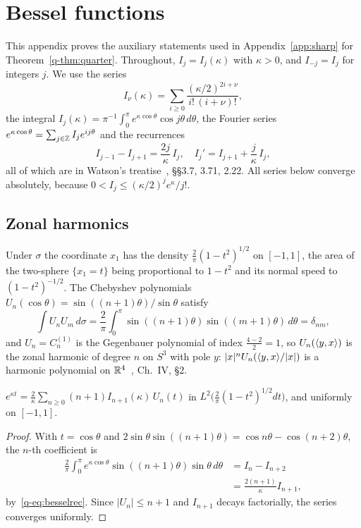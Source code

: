 \section{Bessel functions}\label{app:bessel}

This appendix proves the auxiliary statements used in Appendix~\ref{app:sharp}
for Theorem~\ref{q-thm:quarter}. Throughout, $I_j=I_j(\kappa)$ with $\kappa>0$,
and $I_{-j}=I_j$ for integers $j$. We use the series
\[
I_\nu(\kappa)=\sum_{i\ge0}\frac{(\kappa/2)^{2i+\nu}}{i!\,(i+\nu)!},
\]
the integral $I_j(\kappa)=\pi^{-1}\int_0^\pi e^{\kappa\cos\theta}\cos
j\theta\,d\theta$, the Fourier series $e^{\kappa\cos\theta}=\sum_{j\in\mathbb{Z}}
I_je^{ij\theta}$ and the recurrences
\begin{equation}\label{q-eq:besselrec}
I_{j-1}-I_{j+1}=\frac{2j}\kappa\,I_j,\quad I_j'=I_{j+1}+\frac j\kappa\,I_j ,
\end{equation}
all of which are in Watson's treatise~\cite{Wat44}, \S\S3.7, 3.71,
2.22. All series below converge absolutely, because $0<I_j\le(\kappa/2)^j
e^\kappa/j!$.

\subsection{Zonal harmonics}

Under $\sigma$ the coordinate $x_1$ has the density $\frac2\pi(1-t^2)^{1/2}$
on $[-1,1]$, the area of the two-sphere $\{x_1=t\}$ being proportional to
$1-t^2$ and its normal speed to $(1-t^2)^{-1/2}$. The Chebyshev polynomials
$U_n(\cos\theta)=\sin((n+1)\theta)/\sin\theta$ satisfy
\[
\int U_nU_m\,d\sigma=\frac2\pi\int_0^\pi\sin((n+1)\theta)\sin((m+1)\theta)
\,d\theta=\delta_{nm},
\]
and $U_n=C_n^{(1)}$ is the Gegenbauer polynomial of index $\frac{4-2}2=1$, so
$U_n(\langle y,x\rangle)$ is the zonal harmonic of degree $n$ on $S^3$ with pole $y$:
$|x|^nU_n(\langle y,x\rangle/|x|)$ is a harmonic polynomial on $\mathbb{R}^4$~\cite{SW71},
Ch.~IV, \S2.

\begin{lemma}\label{q-lem:chebexp}
$e^{\kappa t}=\frac2\kappa\sum_{n\ge0}(n+1)I_{n+1}(\kappa)\,U_n(t)$ in
$L^2\bigl(\frac2\pi(1-t^2)^{1/2}dt\bigr)$, and uniformly on $[-1,1]$.
\end{lemma}

\begin{proof}
With $t=\cos\theta$ and $2\sin\theta\sin((n+1)\theta)=\cos n\theta-\cos(
n+2)\theta$, the $n$-th coefficient is
\[
\begin{aligned}
\frac2\pi\int_0^\pi e^{\kappa\cos\theta}\sin((n+1)\theta)\sin\theta\,d\theta
&=I_n-I_{n+2}\\
&=\frac{2(n+1)}\kappa I_{n+1},
\end{aligned}
\]
by~\eqref{q-eq:besselrec}. Since $|U_n|\le n+1$ and $I_{n+1}$ decays
factorially, the series converges uniformly.
\end{proof}

